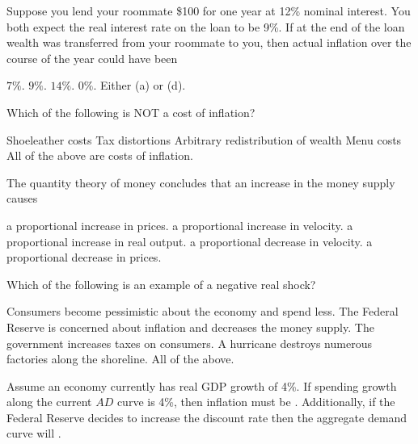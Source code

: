 \documentclass[addpoints,11pt]{exam}
\theoremstyle{definition}
\newcommand{\blank}[0]{\underline{\hspace{3cm}}}
\begin{document}
\begin{questions}
\question Suppose you lend your roommate \$100 for one year at 12\% nominal interest. You both expect the real interest rate on the loan to be 9\%. If at the end of the loan wealth was transferred from your roommate to you, then actual inflation over the course of the year could have been

\begin{choices}
	\choice $7\%$.
	\choice $9\%$.
	\choice $14\%$.
	\CorrectChoice $0\%$.
	\choice Either (a) or (d).
\end{choices}

	\question Which of the following is NOT a cost of inflation?

\begin{choices}
	\choice Shoeleather costs
	\choice Tax distortions
	\choice Arbitrary redistribution of wealth
	\choice Menu costs
	\CorrectChoice All of the above are costs of inflation.
\end{choices}



\question The quantity theory of money concludes that an increase in the money supply causes

\begin{choices}
	\CorrectChoice a proportional increase in prices.
	\choice a proportional increase in velocity.
	\choice a proportional increase in real output.
	\choice a proportional decrease in velocity.
	\choice a proportional decrease in prices.
\end{choices}




\question Which of the following is an example of a negative real shock?

\begin{choices}
	\choice Consumers become pessimistic about the economy and spend less.
	\choice The Federal Reserve is concerned about inflation and decreases the money supply.
	\choice The government increases taxes on consumers.
	\CorrectChoice A hurricane destroys numerous factories along the shoreline.
	\choice All of the above. 
\end{choices}


\question Assume an economy currently has real GDP growth of 4\%. If spending growth along the current $AD$ curve is 4\%, then inflation must be \blank. Additionally, if the Federal Reserve decides to increase the discount rate then the aggregate demand curve will \blank.


\end{questions}
\end{document}
